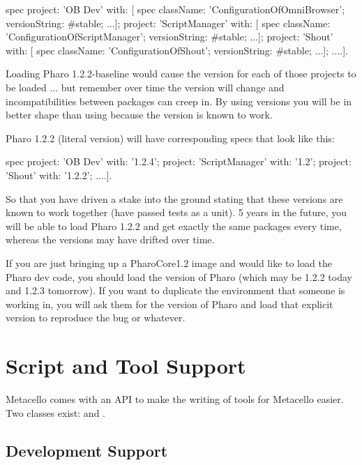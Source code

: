 \documentclass[a4paper,10pt,twoside]{book}
\begin{document}
\begin{code}{}
 spec
    project: 'OB Dev' with: [
      spec
         className: 'ConfigurationOfOmniBrowser';
         versionString: #stable;
         ...];
    project: 'ScriptManager' with: [
      spec
         className: 'ConfigurationOfScriptManager';
         versionString: #stable;
         ...];
    project: 'Shout' with: [
      spec
         className: 'ConfigurationOfShout';
         versionString: #stable;
         ...];
    ....].

Loading Pharo 1.2.2-baseline would cause the  version for each of those projects to be loaded ... 
but remember over time the  version will change and incompatibilities between packages can creep in. 
By using  versions you will be in better shape than using  because the  version is known to work.

Pharo 1.2.2 (literal version) will have corresponding specs that look like this:

\begin{code}{}
 spec
    project: 'OB Dev' with: '1.2.4';
    project: 'ScriptManager' with: '1.2';
    project: 'Shout' with: '1.2.2';
    ....].

So that you have driven a stake into the ground stating that these versions are known to work together (have passed tests as a unit). 5 years in the future, you will be able to load Pharo 1.2.2 and get exactly the same packages every time, whereas the  versions may have drifted over time.

If you are just bringing up a PharoCore1.2 image and would like to load the Pharo dev code, you should load the  version of Pharo (which may be 1.2.2 today and 1.2.3 tomorrow).
If you want to duplicate the environment that someone is working in, you will ask them for the version of Pharo and load that explicit version to reproduce the bug or whatever. 


\section{Script and Tool Support}
Metacello comes with an API to make the writing of tools for Metacello easier. Two classes exist:  and . 

\subsection{Development Support}


\end{code}
\end{code}
\end{document}
